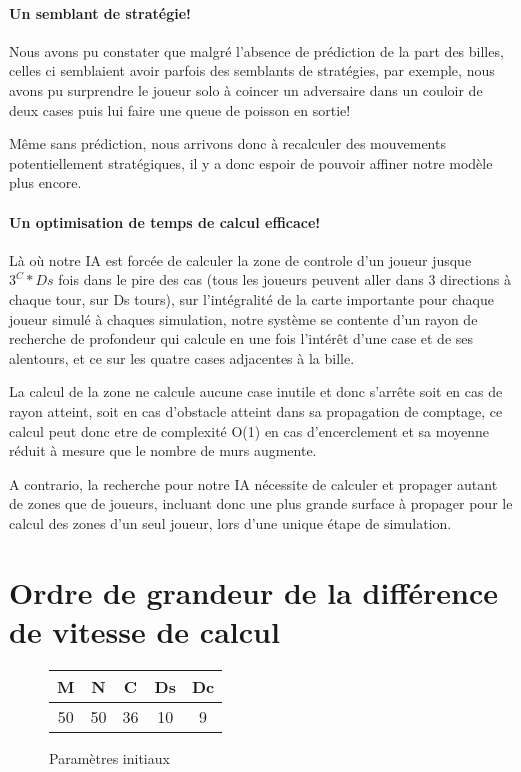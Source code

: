 		\paragraph{Un semblant de stratégie!}
		Nous avons pu constater que malgré l'absence de prédiction de la part des billes, celles ci semblaient avoir parfois des semblants de stratégies, par exemple, nous avons pu surprendre le joueur solo à coincer un adversaire dans un couloir de deux cases puis lui faire une queue de poisson en sortie!
		
		Même sans prédiction, nous arrivons donc à recalculer des mouvements potentiellement stratégiques, il y a donc espoir de pouvoir affiner notre modèle plus encore.
		
		\paragraph{Un optimisation de temps de calcul efficace!}
		Là où notre IA est forcée de calculer la zone de controle d'un joueur jusque $3^C*Ds$ fois dans le pire des cas (tous les joueurs peuvent aller dans 3 directions à chaque tour, sur Ds tours), sur l'intégralité de la carte importante pour chaque joueur simulé à chaques simulation, notre système se contente d'un rayon de recherche de profondeur qui calcule en une fois l'intérêt d'une case et de ses alentours, et ce sur les quatre cases adjacentes à la bille.
		
		La calcul de la zone ne calcule aucune case inutile et donc s'arrête soit en cas de rayon atteint, soit en cas d'obstacle atteint dans sa propagation de comptage, ce calcul peut donc etre de complexité O(1) en cas d'encerclement et sa moyenne réduit à mesure que le nombre de murs augmente.
		
		A contrario, la recherche pour notre IA nécessite de calculer et propager autant de zones que de joueurs, incluant donc une plus grande surface à propager pour le calcul des zones d'un seul joueur, lors d'une unique étape de simulation.
	
	\section{Ordre de grandeur de la différence de vitesse de calcul}
		\begin{figure}[H]
			\centering
			\begin{tabular}{c c c c c}
				M&N&C&Ds&Dc\\\hline
				50&50&36&10&9\\				
			\end{tabular}
		\caption{Paramètres initiaux}	
		\end{figure}
		
